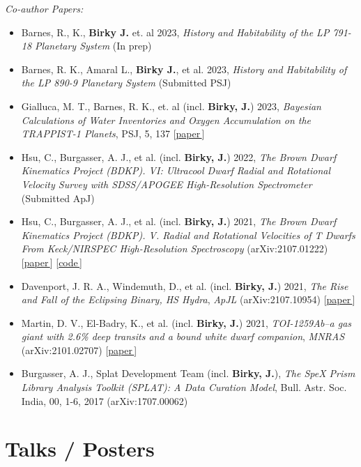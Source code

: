 \documentclass[a4,11pt]{article}
\let\orighref\href
\renewcommand{\href}[2]{\orighref{#1}{#2\,\scriptsize\faExternalLink}}
\begin{document}
\textsl{Co-author Papers:} 
\begin{itemize}[itemsep=0pt]
    \item Barnes, R., K., \textbf{Birky J.} et. al 2023, \textsl{History and Habitability of the LP 791-18 Planetary System} (In prep)
    \item Barnes, R. K., Amaral L., \textbf{Birky J.}, et al. 2023, \textsl{History and Habitability of the LP 890-9 Planetary System} (Submitted PSJ) 
    \item Gialluca, M. T., Barnes, R. K.,  et. al (incl. \textbf{Birky, J.}) 2023, \textsl{Bayesian Calculations of Water Inventories and Oxygen Accumulation on the TRAPPIST-1 Planets}, PSJ, 5, 137  [\href{https://iopscience.iop.org/article/10.3847/PSJ/ad4454/meta}{paper}]
    \item Hsu, C., Burgasser, A. J., et al. (incl. \textbf{Birky, J.}) 2022, \textsl{The Brown Dwarf Kinematics Project (BDKP). VI: Ultracool Dwarf Radial and Rotational Velocity Survey with SDSS/APOGEE High-Resolution Spectrometer} (Submitted ApJ) 
    \item Hsu, C., Burgasser, A. J., et al. (incl. \textbf{Birky, J.}) 2021, \textsl{The Brown Dwarf Kinematics Project (BDKP). V. Radial and Rotational Velocities of T Dwarfs From Keck/NIRSPEC High-Resolution Spectroscopy} (arXiv:2107.01222)  [\href{https://arxiv.org/abs/2107.01222}{paper}] [\href{https://github.com/chihchunhsu/smart}{code}] 
    \item Davenport, J. R. A., Windemuth, D., et al. (incl. \textbf{Birky, J.}) 2021, \textsl{The Rise and Fall of the Eclipsing Binary, HS Hydra}, \textit{ApJL} (arXiv:2107.10954) [\href{https://arxiv.org/abs/2107.10954}{paper}] 
    \item Martin, D. V., El-Badry, K., et al. (incl. \textbf{Birky, J.}) 2021, \textsl{TOI-1259Ab--a gas giant with 2.6\% deep transits and a bound white dwarf companion}, \textit{MNRAS} (arXiv:2101.02707) [\href{https://arxiv.org/abs/2101.02707}{paper}]
    \item Burgasser, A. J., Splat Development Team (incl. \textbf{Birky, J.}), \textsl{The SpeX Prism Library Analysis Toolkit (SPLAT): A Data Curation Model}, Bull. Astr. Soc. India, 00, 1-6, 2017 (arXiv:1707.00062)
\end{itemize}


\section{Talks / Posters}
\end{document}
